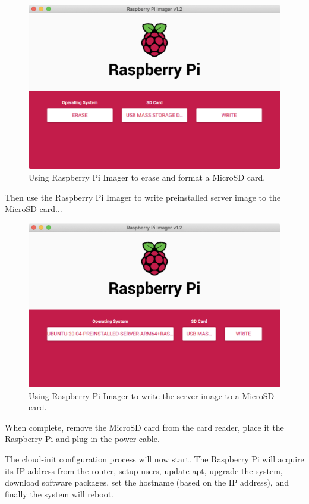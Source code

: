 \documentclass{report}
\begin{document}
\begin{figure}
	\centering	
	\includegraphics[width=1.0\textwidth]{screenshots/imager-erase.png}
	\caption{Using Raspberry Pi Imager to erase and format a MicroSD card.}
\end{figure}

Then use the Raspberry Pi Imager to write preinstalled server image to the MicroSD card...

\begin{figure}
	\centering	
	\includegraphics[width=1.0\textwidth]{screenshots/imager-write.png}
	\caption{Using Raspberry Pi Imager to write the server image to a MicroSD card.}
\end{figure}

When complete, remove the MicroSD card from the card reader, place it the Raspberry Pi and plug in the power cable.

The cloud-init configuration process will now start. The Raspberry Pi will acquire its IP address from the router, setup users, update apt, upgrade the system, download software packages, set the hostname (based on the IP address), and finally the system will reboot.
\end{document}
